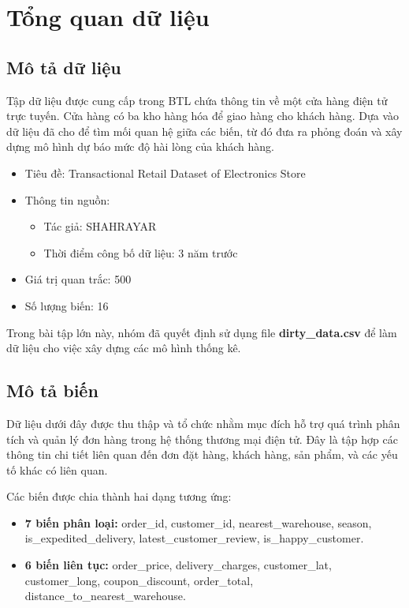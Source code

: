 \section{Tổng quan dữ liệu}
\subsection{Mô tả dữ liệu}
Tập dữ liệu được cung cấp trong BTL chứa thông tin về một cửa hàng điện tử trực tuyến. Cửa hàng có ba kho hàng hóa để giao hàng cho khách hàng. Dựa vào dữ liệu đã cho để tìm mối quan hệ giữa các biến, từ đó đưa ra phỏng đoán và xây dựng mô hình dự báo mức độ hài lòng của khách hàng.

\begin{itemize}
    \item Tiêu đề: Transactional Retail Dataset of Electronics Store
    \item Thông tin nguồn:
        \begin{itemize}
            \item Tác giả: SHAHRAYAR
            \item Thời điểm công bố dữ liệu: 3 năm trước
        \end{itemize}
    \item Giá trị quan trắc: 500
    \item Số lượng biến: 16
\end{itemize}
Trong bài tập lớn này, nhóm đã quyết định sử dụng file \textbf{dirty\_data.csv} để làm dữ liệu cho việc xây dựng các mô hình thống kê.
\subsection{Mô tả biến}
Dữ liệu dưới đây được thu thập và tổ chức nhằm mục đích hỗ trợ quá trình phân tích và quản lý đơn hàng trong hệ thống thương mại điện tử. Đây là tập hợp các thông tin chi tiết liên quan đến đơn đặt hàng, khách hàng, sản phẩm, và các yếu tố khác có liên quan.

Các biến được chia thành hai dạng tương ứng:
\begin{itemize}
    \item \textbf{7 biến phân loại:} order\_id, customer\_id, nearest\_warehouse, season, is\_expedited\_delivery, latest\_customer\_review, is\_happy\_customer.
    \item \textbf{6 biến liên tục:} order\_price, delivery\_charges, customer\_lat, customer\_long, coupon\_discount, order\_total, distance\_to\_nearest\_warehouse. 
\end{itemize}

